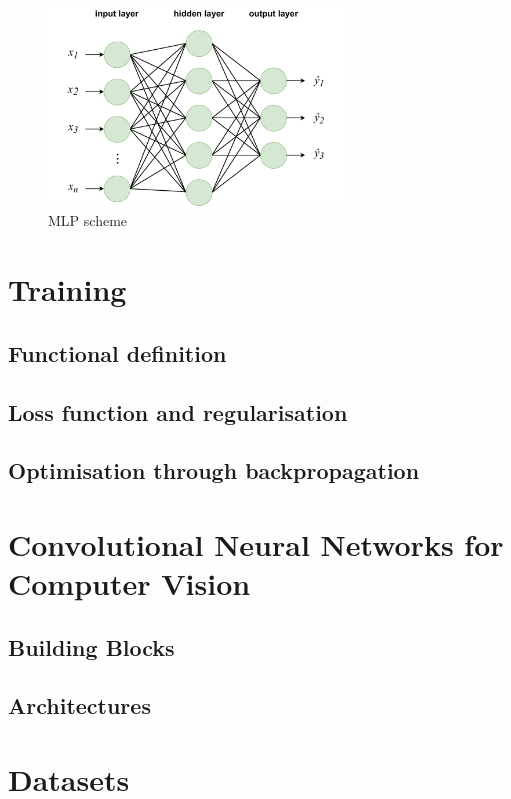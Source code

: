 \begin{figure}[htbp]
  \centering
  \includegraphics[width=0.7\textwidth]{chapter_dlo/assets/mlp_scheme.pdf}
  \caption{\ac{MLP} scheme}
  \label{fig:dlo:mlp}
\end{figure}

\section{Training}\label{sec:dlo:training}
\subsection{Functional definition}
\subsection{Loss function and regularisation}
\subsection{Optimisation through backpropagation}

\section{Convolutional Neural Networks for Computer Vision}\label{sec:dlo:cnn}
\subsection{Building Blocks}
\subsection{Architectures}

\section{Datasets}\label{sec:dlo:datasets}

